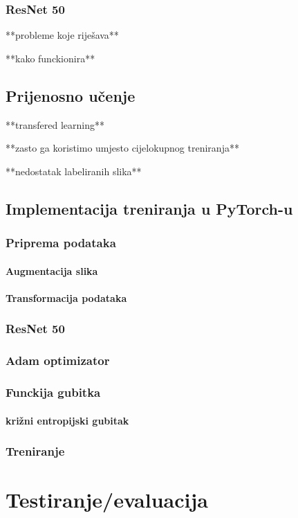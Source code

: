 \documentclass[times, utf8, zavrsni,numeric]{fer}
\begin{document}
\subsection{ResNet 50}
**probleme koje riješava**

**kako funckionira**

\section{Prijenosno učenje}
**transfered learning**

**zasto ga koristimo umjesto cijelokupnog treniranja**

**nedostatak labeliranih slika**

\section{Implementacija treniranja u PyTorch-u}
\subsection{Priprema podataka}
\subsubsection{Augmentacija slika}
\subsubsection{Transformacija podataka}


\subsection{ResNet 50}
\subsection{Adam optimizator}
\subsection{Funckija gubitka}
\subsubsection{križni entropijski gubitak}
\subsection{Treniranje}

\chapter{Testiranje/evaluacija}
\end{document}
